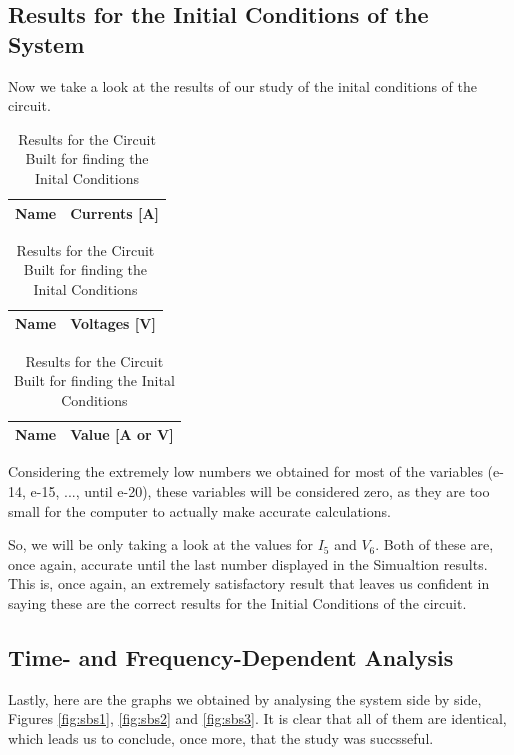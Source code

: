 \clearpage
\subsection{Results for the Initial Conditions of the System}

Now we take a look at the results of our study of the inital conditions of the circuit.

\begin{table}[htb!]
  \begin{tabular}{|l|r|}
    \hline    
    {\bf Name} & {\bf Currents [A]} \\ \hline
    
  \end{tabular}
\quad
  \begin{tabular}{|l|r|}
    \hline    
    {\bf Name} & {\bf Voltages [V]} \\ \hline
    
  \end{tabular}
\quad
  \begin{tabular}{|l|r|}
    \hline    
    {\bf Name} & {\bf Value [A or V]} \\ \hline
    
  \end{tabular}
  \caption{Results for the Circuit Built for finding the Inital Conditions}
\end{table}


Considering the extremely low numbers we obtained for most of the variables (e-14, e-15, ..., until e-20), these variables will be considered zero, as they are too small for the computer to actually make accurate calculations.

So, we will be only taking a look at the values for $I_5$ and $V_6$. Both of these are, once again, accurate until the last number displayed in the Simualtion results. This is, once again, an extremely satisfactory result that leaves us confident in saying these are the correct results for the Initial Conditions of the circuit.

\clearpage
\subsection{Time- and Frequency-Dependent Analysis}

Lastly, here are the graphs we obtained by analysing the system side by side, Figures \ref{fig:sbs1}, \ref{fig:sbs2} and \ref{fig:sbs3}. It is clear that all of them are identical, which leads us to conclude, once more, that the study was succsseful.

